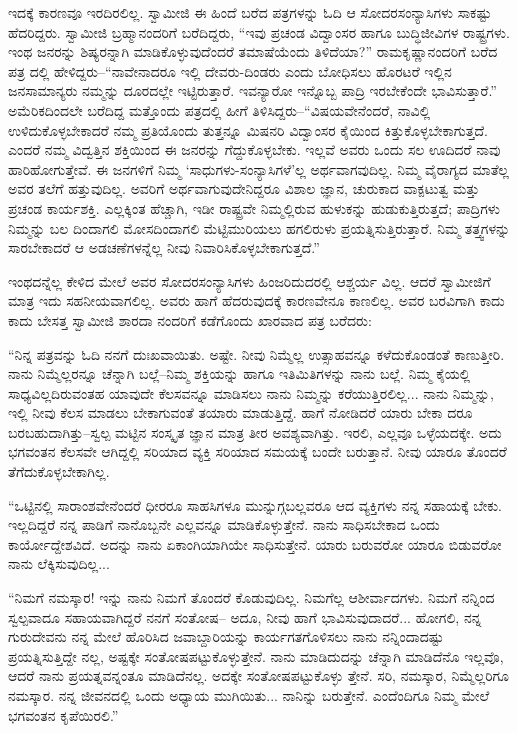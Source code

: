 ಇದಕ್ಕೆ ಕಾರಣವೂ ಇರದಿರಲಿಲ್ಲ. ಸ್ವಾಮೀಜಿ ಈ ಹಿಂದೆ ಬರೆದ ಪತ್ರಗಳನ್ನು ಓದಿ ಆ ಸೋದರಸಂನ್ಯಾಸಿಗಳು ಸಾಕಷ್ಟು ಹೆದರಿದ್ದರು. ಸ್ವಾಮೀಜಿ ಬ್ರಹ್ಮಾನಂದರಿಗೆ ಬರೆದಿದ್ದರು, “ಇವು ಪ್ರಚಂಡ ವಿದ್ವಾಂಸರ ಹಾಗೂ ಬುದ್ಧಿಜೀವಿಗಳ ರಾಷ್ಟ್ರಗಳು. ಇಂಥ ಜನರನ್ನು ಶಿಷ್ಯರನ್ನಾಗಿ ಮಾಡಿಕೊಳ್ಳುವುದೆಂದರೆ ತಮಾಷೆಯೆಂದು ತಿಳಿದೆಯಾ?” ರಾಮಕೃಷ್ಣಾನಂದರಿಗೆ ಬರೆದ ಪತ್ರ ದಲ್ಲಿ ಹೇಳಿದ್ದರು–“ನಾವೇನಾದರೂ ಇಲ್ಲಿ ದೇವರು-ದಿಂಡರು ಎಂದು ಬೋಧಿಸಲು ಹೊರಟರೆ ಇಲ್ಲಿನ ಜನಸಾಮಾನ್ಯರು ನಮ್ಮನ್ನು ದೂರದಲ್ಲೇ ಇಟ್ಟಿರುತ್ತಾರೆ. ಇವನ್ಯಾರೋ ಇನ್ನೊಬ್ಬ ಪಾದ್ರಿ ಇರಬೇಕೆಂದೇ ಭಾವಿಸುತ್ತಾರೆ.” ಅಮೆರಿಕದಿಂದಲೇ ಬರೆದಿದ್ದ ಮತ್ತೊಂದು ಪತ್ರದಲ್ಲಿ ಹೀಗೆ ತಿಳಿಸಿದ್ದರು–“ವಿಷಯವೇನೆಂದರೆ, ನಾವಿಲ್ಲಿ ಉಳಿದುಕೊಳ್ಳಬೇಕಾದರೆ ನಮ್ಮ ಪ್ರತಿಯೊಂದು ತುತ್ತನ್ನೂ ಮಿಷನರಿ ವಿದ್ವಾಂಸರ ಕೈಯಿಂದ ಕಿತ್ತುಕೊಳ್ಳಬೇಕಾಗುತ್ತದೆ. ಎಂದರೆ ನಮ್ಮ ವಿದ್ವತ್ತಿನ ಶಕ್ತಿಯಿಂದ ಈ ಜನರನ್ನು ಗೆದ್ದುಕೊಳ್ಳಬೇಕು. ಇಲ್ಲವೆ ಅವರು ಒಂದು ಸಲ ಊದಿದರೆ ನಾವು ಹಾರಿಹೋಗುತ್ತೇವೆ. ಈ ಜನಗಳಿಗೆ ನಿಮ್ಮ ‘ಸಾಧುಗಳು-ಸಂನ್ಯಾಸಿಗಳೆ’ಲ್ಲ ಅರ್ಥವಾಗವುದಿಲ್ಲ. ನಿಮ್ಮ ವೈರಾಗ್ಯದ ಮಾತೆಲ್ಲ ಅವರ ತಲೆಗೆ ಹತ್ತುವುದಿಲ್ಲ. ಅವರಿಗೆ ಅರ್ಥವಾಗುವುದೇನಿದ್ದರೂ ವಿಶಾಲ ಜ್ಞಾನ, ಚುರುಕಾದ ವಾಕ್ಪಟುತ್ವ ಮತ್ತು ಪ್ರಚಂಡ ಕಾರ್ಯಶಕ್ತಿ. ಎಲ್ಲಕ್ಕಿಂತ ಹೆಚ್ಚಾಗಿ, ಇಡೀ ರಾಷ್ಟ್ರವೇ ನಿಮ್ಮಲ್ಲಿರುವ ಹುಳುಕನ್ನು ಹುಡುಕುತ್ತಿರುತ್ತದೆ; ಪಾದ್ರಿಗಳು ನಿಮ್ಮನ್ನು ಬಲ ದಿಂದಾಗಲಿ ಮೋಸದಿಂದಾಗಲಿ ಮೆಟ್ಟಿಮುರಿಯಲು ಹಗಲಿರುಳು ಪ್ರಯತ್ನಿಸುತ್ತಿರುತ್ತಾರೆ. ನಿಮ್ಮ ತತ್ತ್ವಗಳನ್ನು ಸಾರಬೇಕಾದರೆ ಆ ಅಡಚಣೆಗಳನ್ನೆಲ್ಲ ನೀವು ನಿವಾರಿಸಿಕೊಳ್ಳಬೇಕಾಗುತ್ತದೆ.”

ಇಂಥದನ್ನೆಲ್ಲ ಕೇಳಿದ ಮೇಲೆ ಅವರ ಸೋದರಸಂನ್ಯಾಸಿಗಳು ಹಿಂಜರಿದುದರಲ್ಲಿ ಆಶ್ಚರ್ಯ ವಿಲ್ಲ. ಆದರೆ ಸ್ವಾಮೀಜಿಗೆ ಮಾತ್ರ ಇದು ಸಹನೀಯವಾಗಲಿಲ್ಲ. ಅವರು ಹಾಗೆ ಹೆದರುವುದಕ್ಕೆ ಕಾರಣವೇನೂ ಕಾಣಲಿಲ್ಲ. ಅವರ ಬರವಿಗಾಗಿ ಕಾದು ಕಾದು ಬೇಸತ್ತ ಸ್ವಾಮೀಜಿ ಶಾರದಾ ನಂದರಿಗೆ ಕಡೆಗೊಂದು ಖಾರವಾದ ಪತ್ರ ಬರೆದರು:

“ನಿನ್ನ ಪತ್ರವನ್ನು ಓದಿ ನನಗೆ ದುಃಖವಾಯಿತು. ಅಷ್ಟೇ. ನೀವು ನಿಮ್ಮೆಲ್ಲ ಉತ್ಸಾಹವನ್ನೂ ಕಳೆದುಕೊಂಡಂತೆ ಕಾಣುತ್ತೀರಿ. ನಾನು ನಿಮ್ಮೆಲ್ಲರನ್ನೂ ಚೆನ್ನಾಗಿ ಬಲ್ಲೆ–ನಿಮ್ಮ ಶಕ್ತಿಯನ್ನು ಹಾಗೂ ಇತಿಮಿತಿಗಳನ್ನು ನಾನು ಬಲ್ಲೆ. ನಿಮ್ಮ ಕೈಯಲ್ಲಿ ಸಾಧ್ಯವಿಲ್ಲದಿರುವಂತಹ ಯಾವುದೇ ಕೆಲಸವನ್ನೂ ಮಾಡಿಸಲು ನಾನು ನಿಮ್ಮನ್ನು ಕರೆಯುತ್ತಿರಲಿಲ್ಲ... ನಾನು ನಿಮ್ಮನ್ನು, ಇಲ್ಲಿ ನೀವು ಕೆಲಸ ಮಾಡಲು ಬೇಕಾಗುವಂತೆ ತಯಾರು ಮಾಡುತ್ತಿದ್ದೆ. ಹಾಗೆ ನೋಡಿದರೆ ಯಾರು ಬೇಕಾ ದರೂ ಬರಬಹುದಾಗಿತ್ತು–ಸ್ವಲ್ಪ ಮಟ್ಟಿನ ಸಂಸ್ಕೃತ ಜ್ಞಾನ ಮಾತ್ರ ತೀರ ಅವಶ್ಯವಾಗಿತ್ತು. ಇರಲಿ, ಎಲ್ಲವೂ ಒಳ್ಳೆಯದಕ್ಕೇ. ಅದು ಭಗವಂತನ ಕೆಲಸವೇ ಆಗಿದ್ದಲ್ಲಿ ಸರಿಯಾದ ವ್ಯಕ್ತಿ ಸರಿಯಾದ ಸಮಯಕ್ಕೆ ಬಂದೇ ಬರುತ್ತಾನೆ. ನೀವು ಯಾರೂ ತೊಂದರೆ ತೆಗೆದುಕೊಳ್ಳಬೇಕಾಗಿಲ್ಲ.

“ಒಟ್ಟಿನಲ್ಲಿ ಸಾರಾಂಶವೇನೆಂದರೆ ಧೀರರೂ ಸಾಹಸಿಗಳೂ ಮುನ್ನುಗ್ಗಬಲ್ಲವರೂ ಆದ ವ್ಯಕ್ತಿಗಳು ನನ್ನ ಸಹಾಯಕ್ಕೆ ಬೇಕು. ಇಲ್ಲದಿದ್ದರೆ ನನ್ನ ಪಾಡಿಗೆ ನಾನೊಬ್ಬನೇ ಎಲ್ಲವನ್ನೂ ಮಾಡಿಕೊಳ್ಳುತ್ತೇನೆ. ನಾನು ಸಾಧಿಸಬೇಕಾದ ಒಂದು ಕಾರ್ಯೋದ್ದೇಶವಿದೆ. ಅದನ್ನು ನಾನು ಏಕಾಂಗಿಯಾಗಿಯೇ ಸಾಧಿಸುತ್ತೇನೆ. ಯಾರು ಬರುವರೋ ಯಾರೂ ಬಿಡುವರೋ ನಾನು ಲೆಕ್ಕಿಸುವುದಿಲ್ಲ... 

“ನಿಮಗೆ ನಮಸ್ಕಾರ! ಇನ್ನು ನಾನು ನಿಮಗೆ ತೊಂದರೆ ಕೊಡುವುದಿಲ್ಲ. ನಿಮಗೆಲ್ಲ ಆಶೀರ್ವಾದಗಳು. ನಿಮಗೆ ನನ್ನಿಂದ ಸ್ವಲ್ಪವಾದೂ ಸಹಾಯವಾಗಿದ್ದರೆ ನನಗೆ ಸಂತೋಷ– ಅದೂ, ನೀವು ಹಾಗೆ ಭಾವಿಸುವುದಾದರೆ... ಹೋಗಲಿ, ನನ್ನ ಗುರುದೇವನು ನನ್ನ ಮೇಲೆ ಹೊರಿಸಿದ ಜವಾಬ್ದಾರಿಯನ್ನು ಕಾರ್ಯಗತಗೊಳಿಸಲು ನಾನು ನನ್ನಿಂದಾದಷ್ಟು ಪ್ರಯತ್ನಿಸುತ್ತಿದ್ದೇ ನಲ್ಲ, ಅಷ್ಟಕ್ಕೇ ಸಂತೋಷಪಟ್ಟುಕೊಳ್ಳುತ್ತೇನೆ. ನಾನು ಮಾಡಿದುದನ್ನು ಚೆನ್ನಾಗಿ ಮಾಡಿದೆನೊ ಇಲ್ಲವೊ, ಆದರೆ ನಾನು ಪ್ರಯತ್ನವನ್ನಂತೂ ಮಾಡಿದೆನಲ್ಲ. ಅದಕ್ಕೇ ಸಂತೋಷಪಟ್ಟುಕೊಳ್ಳು ತ್ತೇನೆ. ಸರಿ, ನಮಸ್ಕಾರ, ನಿಮ್ಮೆಲ್ಲರಿಗೂ ನಮಸ್ಕಾರ. ನನ್ನ ಜೀವನದಲ್ಲಿ ಒಂದು ಅಧ್ಯಾಯ ಮುಗಿಯಿತು... ನಾನಿನ್ನು ಬರುತ್ತೇನೆ. ಎಂದೆಂದಿಗೂ ನಿಮ್ಮ ಮೇಲೆ ಭಗವಂತನ ಕೃಪೆಯಿರಲಿ.”

